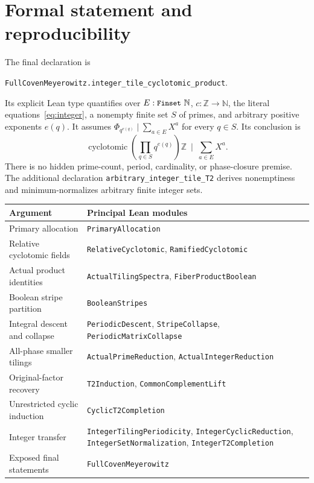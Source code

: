 \documentclass[11pt]{article}
\newcommand{\Z}{\mathbb Z}
\newcommand{\PhiC}{\Phi}
\newcommand{\code}[1]{\texttt{\small #1}}
\begin{document}
\section{Formal statement and reproducibility}\label{app:formal}
The final declaration is
\begin{center}
\code{FullCovenMeyerowitz.integer\_tile\_cyclotomic\_product}.
\end{center}
Its explicit Lean type quantifies over $E:\code{Finset}\ \mathbb N$, $c:\Z\to\mathbb N$, the literal equations~\eqref{eq:integer}, a nonempty finite set $S$ of primes, and arbitrary positive exponents $e(q)$. It assumes $\PhiC_{q^{e(q)}}\mid\sum_{a\in E}X^a$ for every $q\in S$. Its conclusion is
\[
 \operatorname{cyclotomic}\!\left(\prod_{q\in S}q^{e(q)}\right)\Z
 \ \mid\ \sum_{a\in E}X^a.
\]
There is no hidden prime-count, period, cardinality, or phase-closure premise. The additional declaration \code{arbitrary\_integer\_tile\_T2} derives nonemptiness and minimum-normalizes arbitrary finite integer sets.

\small
\begin{center}
\begin{tabular}{>{\raggedright\arraybackslash}p{}>{\raggedright\arraybackslash}p{}}
\textbf{Argument} & \textbf{Principal Lean modules}\\\hline
Primary allocation & \code{PrimaryAllocation}\\
Relative cyclotomic fields & \code{RelativeCyclotomic}, \code{RamifiedCyclotomic}\\
Actual product identities & \code{ActualTilingSpectra}, \code{FiberProductBoolean}\\
Boolean stripe partition & \code{BooleanStripes}\\
Integral descent and collapse & \code{PeriodicDescent}, \code{StripeCollapse}, \code{PeriodicMatrixCollapse}\\
All-phase smaller tilings & \code{ActualPrimeReduction}, \code{ActualIntegerReduction}\\
Original-factor recovery & \code{T2Induction}, \code{CommonComplementLift}\\
Unrestricted cyclic induction & \code{CyclicT2Completion}\\
Integer transfer & \code{IntegerTilingPeriodicity}, \code{IntegerCyclicReduction}, \code{IntegerSetNormalization}, \code{IntegerT2Completion}\\
Exposed final statements & \code{FullCovenMeyerowitz}\\\hline
\end{tabular}
\end{center}
\normalsize
\end{document}
